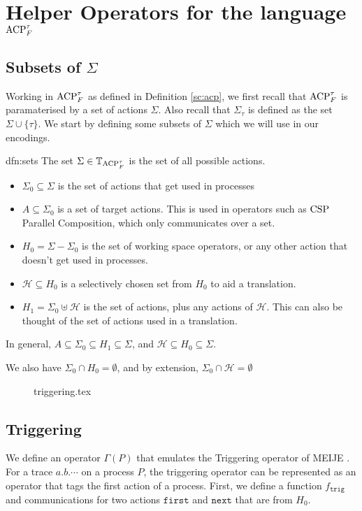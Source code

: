 \documentclass[../hons_project.tex]{subfiles}
\begin{document}
\section{Helper Operators for the language \texorpdfstring{$\mathrm{ACP}_{F}^{\tau}$}{ACPtf}}

\subsection{Subsets of \texorpdfstring{$\Sigma$}{Sigma}}
Working in $\mathrm{ACP}_{F}^{\tau}$ as defined in Definition \ref{sc:acp}, we first recall that $\mathrm{ACP}_{F}^{\tau}$ is paramaterised by a set of actions $\Sigma$. Also recall that $\Sigma_{\tau}$ is defined as the set $\Sigma \cup \{\tau\}$. We start by defining some subsets of $\Sigma$ which we will use in our encodings.

\begin{dfn}[Subsets of A]{dfn:sets}{}
	The set $\Sigma\in \mathbb{T}_{\mathrm{ACP}_{F}^{\tau}}$ is the set of all possible actions.
	\begin{itemize}
		\item $\Sigma_{0} \subseteq \Sigma$ is the set of actions that get used in processes
		\item $A \subseteq \Sigma_{0}$ is a set of target actions. This is used in operators such as $\mathrm{CSP}$ Parallel Composition, which only communicates over a set.
		\item $H_{0} = \Sigma - \Sigma_{0}$ is the set of working space operators, or any other action that doesn't get used in processes.
		\item $\mathscr{H} \subseteq H_{0}$ is a selectively chosen set from $H_{0}$ to aid a translation.
		\item $H_{1} = \Sigma_{0} \uplus \mathscr{H}$ is the set of actions, plus any actions of $\mathscr{H}$. This can also be thought of the set of actions used in a translation.
	\end{itemize}

	In general, $A \subseteq \Sigma_{0} \subseteq H_{1} \subseteq \Sigma$, and $\mathscr{H} \subseteq H_{0} \subseteq \Sigma$.

	We also have $\Sigma_{0} \cap H_{0} = \emptyset$, and by extension, $\Sigma_{0} \cap \mathscr{H} = \emptyset$
\end{dfn}


\begin{figure}[!ht]
	\centering
	{triggering.tex}
\end{figure}
\subsection{Triggering}\label{ssec:triggering}
We define an operator $\Gamma(P)$ that emulates the Triggering operator of MEIJE \cite{austryAlgebreProcessusSynchronisation1984, desimoneHigherlevelSynchronisingDevices1985}. For a trace $a.b.\cdots$ on a process $P$, the triggering operator can be represented as an operator that tags the first action of a process.
First, we define a function $f_{\mathtt{trig}}$ and communications for two actions $\mathtt{first}$ and $\mathtt{next}$ that are from $H_{0}$.
\end{document}
